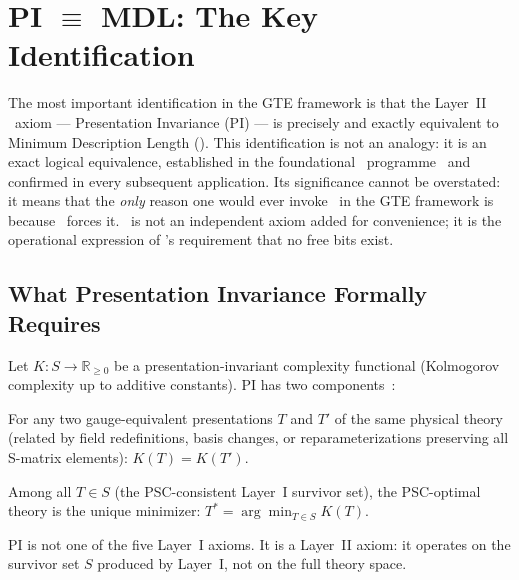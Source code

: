 \documentclass[11pt,openany]{book}
\theoremstyle{remark}
\newcommand{\MDL}{\text{MDL}}
\newcommand{\PSC}{\text{PSC}}
\newcommand{\NEMS}{\text{NEMS}}
\begin{document}
\FloatBarrier

\section{PI $\equiv$ MDL: The Key Identification}
\label{sec:pi_mdl}

The most important identification in the GTE framework is that the Layer~II \PSC\ axiom
--- Presentation Invariance (PI) --- is precisely and exactly equivalent to Minimum
Description Length (\MDL). This identification is not an analogy: it is an exact
logical equivalence, established in the foundational \NEMS\ programme~\cite{SpivackNEMS05}
and confirmed in every subsequent application. Its significance cannot be overstated:
it means that the \emph{only} reason one would ever invoke \MDL\ in the GTE framework
is because \PSC\ forces it. \MDL\ is not an independent axiom added for convenience;
it is the operational expression of \PSC's requirement that no free bits exist.

\subsection*{What Presentation Invariance Formally Requires}

\begin{tcolorbox}[colback=green!5,colframe=green!50!black,
  title={Definition: PI --- Presentation Invariance (Layer~II PSC Axiom)}]
Let $K: S \to \mathbb{R}_{\geq 0}$ be a presentation-invariant complexity functional
(Kolmogorov complexity up to additive constants). PI has two components~\cite{SpivackNEMS05}:
\begin{description}[leftmargin=1.8cm,itemsep=3pt]
\item[(a) Invariance:] For any two gauge-equivalent presentations $T$ and $T'$ of the
  same physical theory (related by field redefinitions, basis changes, or
  reparameterizations preserving all S-matrix elements): $K(T) = K(T')$.
\item[(b) Selection:] Among all $T \in S$ (the PSC-consistent Layer~I survivor set),
  the PSC-optimal theory is the unique minimizer: $T^* = \arg\min_{T \in S} K(T)$.
\end{description}
PI is not one of the five Layer~I axioms. It is a Layer~II axiom: it operates on the
survivor set $S$ produced by Layer~I, not on the full theory space.
\end{tcolorbox}
\end{document}
